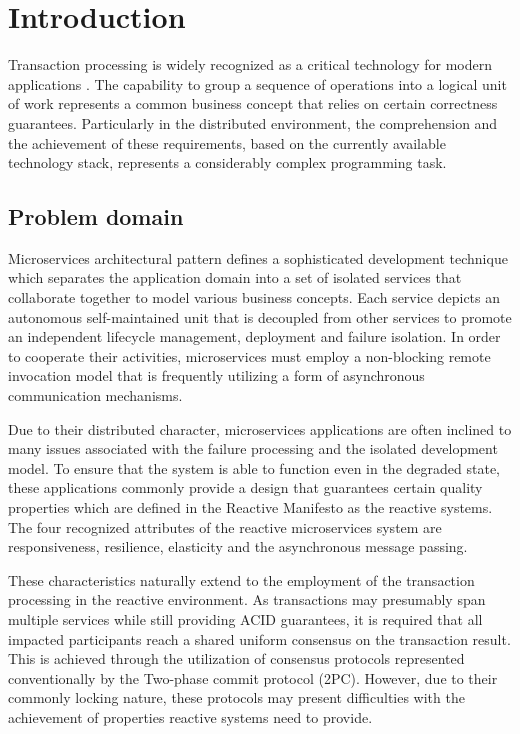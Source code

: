 \documentclass[oneside,
  digital, %
  table,   %
  lof,     %
  lot,     %
]{fithesis3}
\begin{document}
\chapter{Introduction}

Transaction processing is widely recognized as a critical technology for modern applications \cite{java_tran_processing}. The capability to group a sequence of operations into a logical unit of work represents a common business concept that relies on certain correctness guarantees.  Particularly in the distributed environment, the comprehension and the achievement of these requirements, based on the currently available technology stack, represents a considerably complex programming task.

\section{Problem domain}

Microservices architectural pattern defines a sophisticated development technique which separates the application domain into a set of isolated services that collaborate together to model various business concepts. Each service depicts an autonomous self-maintained unit that is decoupled from other services to promote an independent lifecycle management, deployment and failure isolation. In order to cooperate their activities, microservices must employ a non-blocking remote invocation model that is frequently utilizing a form of asynchronous communication mechanisms.

Due to their distributed character, microservices applications are often inclined to many issues associated with the failure processing and the isolated development model. To ensure that the system is able to function even in the degraded state, these applications commonly provide a design that guarantees certain quality properties which are defined in the Reactive Manifesto \cite{reactive_manifesto} as the reactive systems. The four recognized attributes of the reactive microservices system are responsiveness, resilience, elasticity and the asynchronous message passing.

These characteristics naturally extend to the employment of the transaction processing in the reactive environment. As transactions may presumably span multiple services while still providing ACID guarantees, it is required that all impacted participants reach a shared uniform consensus on the transaction result. This is achieved through the utilization of consensus protocols represented conventionally by the Two-phase commit protocol (2PC). However, due to their commonly locking nature, these protocols may present difficulties with the achievement of properties reactive systems need to provide.
\end{document}
